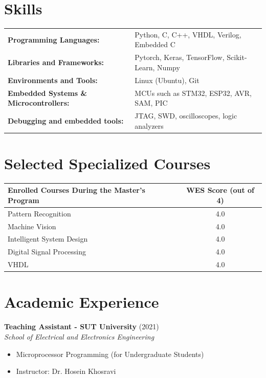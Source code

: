 \documentclass[10pt,a4paper]{article}
\begin{document}
	\vspace{8pt}
	
	\section{Skills}
	
	\begin{tabularx}{\textwidth}{@{}l X@{}}
		\textbf{Programming Languages:} & Python, C, C++, VHDL, Verilog, Embedded C \\
		\textbf{Libraries and Frameworks:} & Pytorch, Keras, TensorFlow, Scikit-Learn, Numpy \\
		\textbf{Environments and Tools:} & Linux (Ubuntu), Git \\
		\textbf{Embedded Systems \& Microcontrollers:} & MCUs such as STM32, ESP32, AVR, SAM, PIC \\
		\textbf{Debugging and embedded tools:} & JTAG, SWD, oscilloscopes, logic analyzers \\
	\end{tabularx}
	
	\section{Selected Specialized Courses}
	
	\begin{center}
		\renewcommand{\arraystretch}{1.2}
		\begin{tabular}{p{8cm} c}
			\textbf{Enrolled Courses During the Master's Program} & \textbf{WES Score (out of 4)} \\
			\hline
			Pattern Recognition & 4.0 \\
			Machine Vision & 4.0 \\
			Intelligent System Design & 4.0 \\
			Digital Signal Processing & 4.0 \\
			VHDL & 4.0 \\
		\end{tabular}
	\end{center}
	
	\section{Academic Experience}
	
	\textbf{Teaching Assistant - SUT University} \hfill (2021) \\
	\textit{School of Electrical and Electronics Engineering}
	\begin{itemize}
		\item Microprocessor Programming (for Undergraduate Students)
		\item Instructor: Dr. Hosein Khosravi
	\end{itemize}
	
\end{document}
